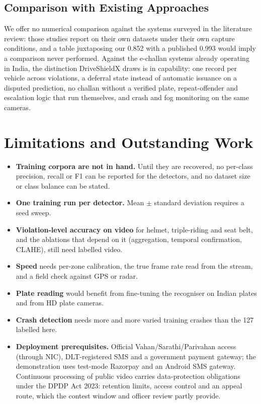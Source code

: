 \documentclass[10pt,a4paper,twocolumn]{article}
\begin{document}
\subsection{Comparison with Existing Approaches}
We offer no numerical comparison against the systems surveyed in the literature review: those studies report on their own datasets
under their own capture conditions, and a table juxtaposing our 0.852 with a published 0.993 would imply a comparison
never performed. Against the e-challan systems already operating in India, the distinction DriveShieldX draws is in
capability: one record per vehicle across violations, a deferral state instead of automatic issuance on a disputed
prediction, no challan without a verified plate, repeat-offender and escalation logic that run themselves, and crash and
fog monitoring on the same cameras.

\section{Limitations and Outstanding Work}
\begin{itemize}
\item \textbf{Training corpora are not in hand.} Until they are recovered, no per-class precision, recall or F1 can be
reported for the detectors, and no dataset size or class balance can be stated.
\item \textbf{One training run per detector.} Mean $\pm$ standard deviation requires a seed sweep.
\item \textbf{Violation-level accuracy on video} for helmet, triple-riding and seat belt, and the ablations that depend
on it (aggregation, temporal confirmation, CLAHE), still need labelled video.
\item \textbf{Speed} needs per-zone calibration, the true frame rate read from the stream, and a field check against GPS
or radar.
\item \textbf{Plate reading} would benefit from fine-tuning the recogniser on Indian plates and from HD plate cameras.
\item \textbf{Crash detection} needs more and more varied training crashes than the 127 labelled here.
\item \textbf{Deployment prerequisites.} Official Vahan/Sarathi/Parivahan access (through NIC), DLT-registered SMS and
a government payment gateway; the demonstration uses test-mode Razorpay and an Android SMS gateway. Continuous
processing of public video carries data-protection obligations under the DPDP Act 2023: retention limits, access
control and an appeal route, which the contest window and officer review partly provide.
\end{itemize}
\end{document}

